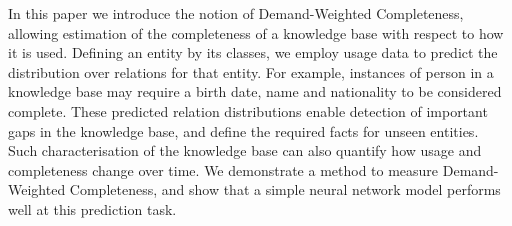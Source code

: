In this paper we introduce the notion of Demand-Weighted Completeness, allowing estimation of the completeness of a knowledge base with respect to how it is used. Defining an entity by its classes, we employ usage data to predict the distribution over relations for that entity. For example, instances of person in a knowledge base may require a birth date, name and nationality to be considered complete. These predicted relation distributions enable detection of important gaps in the knowledge base, and define the required facts for unseen entities. Such characterisation of the knowledge base can also quantify how usage and completeness change over time. We demonstrate a method to measure Demand-Weighted Completeness, and show that a simple neural network model performs well at this prediction task.

